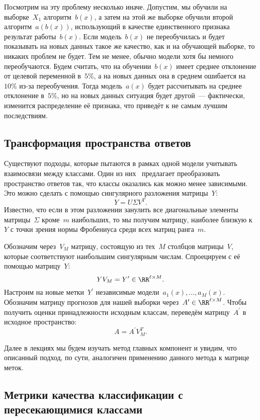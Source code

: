 \documentclass[12pt,fleqn]{article}
\begin{document}
Посмотрим на эту проблему несколько иначе.
Допустим, мы обучили на выборке~$X_1$ алгоритм~$b(x)$,
а затем на этой же выборке обучили второй алгоритм~$a(b(x))$,
использующий в качестве единственного признака результат работы~$b(x)$.
Если модель~$b(x)$ не переобучилась и будет показывать на новых данных такое же
качество, как и на обучающей выборке, то никаких проблем не будет.
Тем не менее, обычно модели хотя бы немного переобучаются.
Будем считать, что на обучении~$b(x)$ имеет среднее отклонение от целевой переменной в~$5\%$,
а на новых данных она в среднем ошибается на~$10\%$ из-за переобучения.
Тогда модель~$a(x)$ будет рассчитывать на среднее отклонение в~$5\%$, но на новых
данных ситуация будет другой~--- фактически, изменится распределение её признака,
что приведёт к не самым лучшим последствиям.

\subsection{Трансформация пространства ответов}

Существуют подходы, которые пытаются в рамках одной модели учитывать взаимосвязи между классами.
Один из них~\cite{tai12multilabel} предлагает преобразовать пространство
ответов так, что классы оказались как можно менее зависимыми.
Это можно сделать с помощью сингулярного разложения матрицы~$Y$:
\[
    Y = U \Sigma V^T.
\]
Известно, что если в этом разложении занулить все диагональные элементы
матрицы~$\Sigma$ кроме~$m$ наибольших, то мы получим матрицу,
наиболее близкую к~$Y$ с точки зрения нормы Фробениуса среди
всех матриц ранга~$m$.

Обозначим через~$V_M$ матрицу, состоящую из тех~$M$ столбцов матрицы~$V$,
которые соответствуют наибольшим сингулярным числам.
Спроецируем с её помощью матрицу~$Y$:
\[
    Y V_M
    =
    Y^\prime
    \in
    \RR^{\ell \times M}.
\]
Настроим на новые метки~$Y^\prime$ независимые модели~$a_1(x), \dots, a_M(x)$.
Обозначим матрицу прогнозов для нашей выборки через~$A^\prime \in \RR^{\ell \times M}$.
Чтобы получить оценки принадлежности исходным классам, переведём матрицу~$A^\prime$ в исходное пространство:
\[
    A = A^\prime V_M^T.
\]

Далее в лекциях мы будем изучать метод главных компонент и увидим,
что описанный подход, по сути, аналогичен применению данного метода
к матрице меток.

\subsection{Метрики качества классификации с пересекающимися классами}
\end{document}
